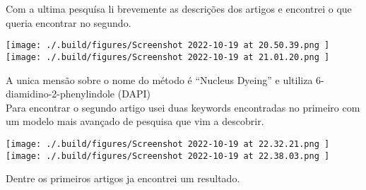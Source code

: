 \documentclass[\mainfilename]{subfiles}
\begin{document}
\begin{questionBox}
    Com a ultima pesquísa li brevemente as descrições dos artigos e encontrei o que queria encontrar no segundo.

    \begin{center}
        \texttt{[image: 
            ./.build/figures/Screenshot 2022-10-19 at 20.50.39.png
        ]}
        \texttt{[image: 
            ./.build/figures/Screenshot 2022-10-19 at 21.01.20.png
        ]}
    \end{center}

    A unica mensão sobre o nome do método é ``Nucleus Dyeing'' e ultiliza 6-diamidino-2-phenylindole (DAPI) \cite{r1}\\

    Para encontrar o segundo artigo usei duas keywords encontradas no primeiro com um modelo mais avançado de pesquisa que vim a descobrir.

    \begin{center}
        \texttt{[image: 
            ./.build/figures/Screenshot 2022-10-19 at 22.32.21.png
        ]}
        \texttt{[image: 
            ./.build/figures/Screenshot 2022-10-19 at 22.38.03.png
        ]}
    \end{center}

    Dentre os primeiros artigos ja encontrei um resultado. \cite{r2}


        
\end{questionBox}
\end{document}
